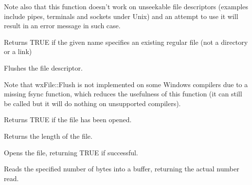 Note also that this function doesn't work on unseekable file descriptors
(examples include pipes, terminals and sockets under Unix) and an attempt to
use it will result in an error message in such case.

\label{wxfileexists}


Returns TRUE if the given name specifies an existing regular file (not a
directory or a link)

\label{wxfileflush}


Flushes the file descriptor.

Note that wxFile::Flush is not implemented on some Windows compilers
due to a missing fsync function, which reduces the usefulness of this function
(it can still be called but it will do nothing on unsupported compilers).

\label{wxfileisopened}


Returns TRUE if the file has been opened.

\label{wxfilelength}


Returns the length of the file.

\label{wxfileopen}


Opens the file, returning TRUE if successful.




\label{wxfileread}


Reads the specified number of bytes into a buffer, returning the actual number read.



